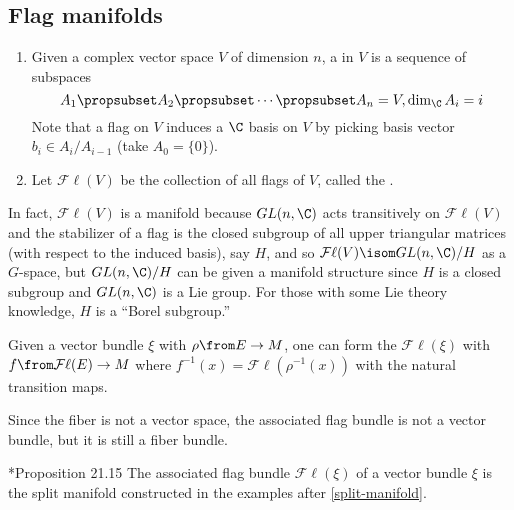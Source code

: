 \documentclass[11pt,leqno,oneside]{amsbook}
\numberwithin{thm}{section}
\newcommand{\Fl}{\mathcal{F\ell}}
\begin{document}
\subsection{Flag manifolds}
\begin{defn}
  \begin{enumerate}
  \item Given a complex vector space \(V\) of dimension \(n\), a
     in \(V\) is a sequence of subspaces
    \[ A_1 \propsubset A_2 \propsubset \cdots \propsubset A_n = V,
      \dim_\C A_i = i
    \]
    Note that a flag on \(V\) induces a \(\C\) basis on \(V\) by
    picking basis vector \(b_i \in A_{i}/A_{i-1}\) (take \(A_0 = \{0\}\)).
  \item Let \(\Fl(V)\) be the collection of all flags of \(V\), called
    the . 
  \end{enumerate}
\end{defn}
\begin{rmk}\label{flag-manifold-is-a-manifold}
  In fact, \(\Fl(V)\) is a manifold because \(GL(n,\C)\) acts
  transitively on \(\Fl(V)\) and the stabilizer of a flag is the
  closed subgroup of all upper triangular matrices (with respect to
  the induced basis), say \(H\), and so \(\Fl(V) \isom GL(n,\C)/H\) as
  a \(G\)-space, but \(GL(n,\C)/H\) can be given a manifold structure
  since \(H\) is a closed subgroup and \(GL(n,\C)\) is a Lie
  group. For those with some Lie theory knowledge, \(H\) is a ``Borel subgroup.''
\end{rmk}
\begin{defn}
  Given a vector bundle \(\xi\) with \(\rho \from E \to M\), one can form the
   \(\Fl(\xi)\) with \(f \from \Fl(E) \to M\)
  where \(f^{-1}(x) = \Fl(\rho^{-1}(x))\) with the natural transition maps.
\end{defn}
Since the fiber is not a vector space, the associated flag bundle is
not a vector bundle, but it is still a fiber bundle.
\begin{prop}
  \cite{bott-tu}*{Proposition 21.15} The associated flag bundle \(\Fl(\xi)\) of a vector bundle \(\xi\)
  is the split manifold constructed in the examples after
  \ref{split-manifold}. 
\end{prop}
\end{document}
